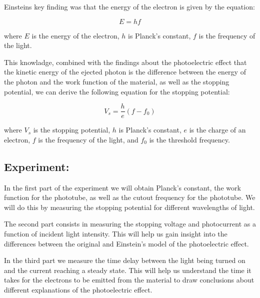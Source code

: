 Einsteins key finding was that the energy of the electron is given by the equation:

\begin{equation}
    \label{eq:energy}
    E = hf
\end{equation}

where $E$ is the energy of the electron, $h$ is Planck's constant, $f$ is the frequency of the light.

This knowladge, combined with the findings about the photoelectric effect that the kinetic energy of the ejected photon is the difference between the energy of the photon and the work function of the material, as well as the stopping potential, we can derive the following equation for the stopping potential:

\begin{equation}
    \label{eq:stopping}
    V_{s} = \frac{h}{e}(f-f_0)
\end{equation}

where $V_s$ is the stopping potential, $h$ is Planck's constant, $e$ is the charge of an electron, $f$ is the frequency of the light, and $f_0$ is the threshold frequency.


\subsection{Experiment:}

In the first part of the experiment we will obtain Planck's constant, the work function for the phototube, as well as the cutout frequency for the phototube. We will do this by measuring the stopping potential for different wavelengths of light.

The second part consists in measuring the stopping voltage and photocurrent as a function of incident light intensity. This will help us gain insight into the differences between the original and Einstein's model of the photoelectric effect.

In the third part we measure the time delay between the light being turned on and the current reaching a steady state. This will help us understand the time it takes for the electrons to be emitted from the material to draw conclusions about different explanations of the photoelectric effect.